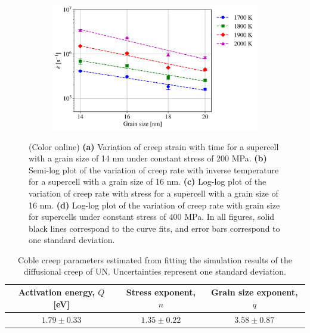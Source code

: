 \documentclass[preprint,12pt,sort&compress]{elsarticle}
\newcommand{\?}{\stackrel{?}{=}}
\begin{document}
\begin{figure}[h!]
\begin{subfigure}{0.48\textwidth}
    \caption{}
    \label{Fig:strain-rate-vs-stress-16-nm}
\end{subfigure}
\hfill
\begin{subfigure}{0.48\textwidth}
    \includegraphics[width=\textwidth]{strain-rate-vs-grain-size-4-MPa.png}
    \caption{}
    \label{Fig:strain-rate-vs-grain-size-400-MPa}
\end{subfigure}
\caption{(Color online) \textbf{(a)} Variation of creep strain with time for a supercell with a grain size of 14 nm under constant stress of 200 MPa. \textbf{(b)} Semi-log plot of the variation of creep rate with inverse temperature for a supercell with a grain size of 16 nm. \textbf{(c)} Log-log plot of the variation of creep rate with stress for a supercell with a grain size of 16 nm. \textbf{(d)} Log-log plot of the variation of creep rate with grain size for supercells under constant stress of 400 MPa. In all figures, solid black lines correspond to the curve fits, and error bars correspond to one standard deviation.}
\label{Fig:Creep}
\end{figure}

\begin{table}[h]
\centering
\caption{Coble creep parameters estimated from fitting the simulation results of the diffusional creep of UN. Uncertainties represent one standard deviation.}
\footnotesize
\begin{tabular}{ccc}
\hline
Activation energy, $Q$ [eV] & Stress exponent, $n$ & Grain size exponent, $q$ \\
\hline
$1.79 \pm 0.33$             & $1.35 \pm 0.22$      & $3.58 \pm 0.87$ \\
\hline
\end{tabular}
\label{Tab:CreepParams}
\end{table}
\end{document}
